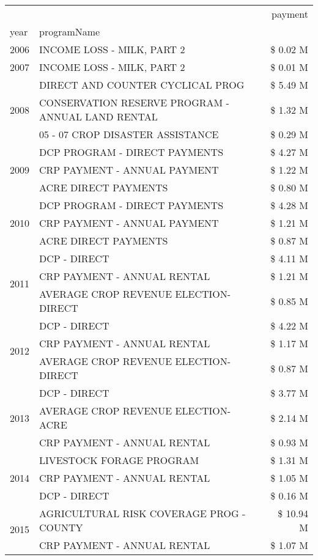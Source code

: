 \begin{tabular}{llr}
\toprule
 &  & payment \\
year & programName &  \\
\midrule
2006 & INCOME LOSS - MILK, PART 2 & \$ 0.02 M \\
\cline{1-3}
2007 & INCOME LOSS - MILK, PART 2 & \$ 0.01 M \\
\cline{1-3}
\multirow[t]{3}{*}{2008} & DIRECT AND COUNTER CYCLICAL PROG & \$ 5.49 M \\
 & CONSERVATION RESERVE PROGRAM - ANNUAL LAND RENTAL & \$ 1.32 M \\
 & 05 - 07 CROP DISASTER ASSISTANCE & \$ 0.29 M \\
\cline{1-3}
\multirow[t]{3}{*}{2009} & DCP PROGRAM - DIRECT PAYMENTS & \$ 4.27 M \\
 & CRP PAYMENT - ANNUAL PAYMENT & \$ 1.22 M \\
 & ACRE DIRECT PAYMENTS & \$ 0.80 M \\
\cline{1-3}
\multirow[t]{3}{*}{2010} & DCP PROGRAM - DIRECT PAYMENTS & \$ 4.28 M \\
 & CRP PAYMENT - ANNUAL PAYMENT & \$ 1.21 M \\
 & ACRE DIRECT PAYMENTS & \$ 0.87 M \\
\cline{1-3}
\multirow[t]{3}{*}{2011} & DCP - DIRECT & \$ 4.11 M \\
 & CRP PAYMENT - ANNUAL RENTAL & \$ 1.21 M \\
 & AVERAGE CROP REVENUE ELECTION-DIRECT & \$ 0.85 M \\
\cline{1-3}
\multirow[t]{3}{*}{2012} & DCP - DIRECT & \$ 4.22 M \\
 & CRP PAYMENT - ANNUAL RENTAL & \$ 1.17 M \\
 & AVERAGE CROP REVENUE ELECTION-DIRECT & \$ 0.87 M \\
\cline{1-3}
\multirow[t]{3}{*}{2013} & DCP - DIRECT & \$ 3.77 M \\
 & AVERAGE CROP REVENUE ELECTION-ACRE & \$ 2.14 M \\
 & CRP PAYMENT - ANNUAL RENTAL & \$ 0.93 M \\
\cline{1-3}
\multirow[t]{3}{*}{2014} & LIVESTOCK FORAGE PROGRAM & \$ 1.31 M \\
 & CRP PAYMENT - ANNUAL RENTAL & \$ 1.05 M \\
 & DCP - DIRECT & \$ 0.16 M \\
\cline{1-3}
\multirow[t]{3}{*}{2015} & AGRICULTURAL RISK COVERAGE PROG - COUNTY & \$ 10.94 M \\
 & CRP PAYMENT - ANNUAL RENTAL & \$ 1.07 M \\

\end{tabular}
